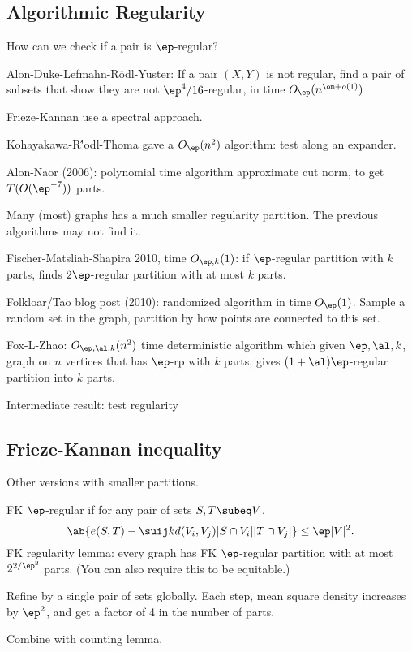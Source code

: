\subsection{Algorithmic Regularity}

How can we check if a pair is $\ep$-regular?

Alon-Duke-Lefmahn-R\"odl-Yuster: If a pair $(X,Y)$ is not regular, find a pair of subsets that show they are not $\ep^4/16$-regular, in time $O_\ep(n^{\om+o(1)})$

Frieze-Kannan use a spectral approach.

Kohayakawa-R\''odl-Thoma gave a $O_\ep(n^2)$ algorithm: test along an expander.

Alon-Naor (2006): polynomial time algorithm approximate cut norm, to get $T(O(\ep^{-7}))$ parts.

Many (most) graphs has a much smaller regularity partition. The previous algorithms may not find it. 

Fischer-Matsliah-Shapira 2010, time $O_{\ep,k}(1)$: if $\ep$-regular partition with $k$ parts, finds $2\ep$-regular partition with at most $k$ parts.

Folkloar/Tao blog post (2010): randomized algorithm in time $O_\ep(1)$. Sample a random set in the graph, partition by how points are connected to this set.

Fox-L-Zhao: $O_{\ep,\al, k}(n^2)$ time deterministic algorithm which given $\ep,\al,k$, graph on $n$ vertices that has $\ep$-rp with $k$ parts, gives $(1+\al)\ep$-regular partition into $k$ parts. 

Intermediate result: test regularity

\subsection{Frieze-Kannan inequality}

Other versions with smaller partitions.

FK $\ep$-regular if for any pair of sets $S,T\subeq V$,
$$
\ab{
e(S,T)-\suij kd(V_i,V_j) |S\cap V_i||T\cap V_j|
} \le \ep|V|^2.
$$
FK regularity lemma: every graph has FK $\ep$-regular partition with at most $2^{2/\ep^2}$ parts.  (You can also require this to be equitable.)

Refine by a single pair of sets globally. Each step, mean square density increases by $\ep^2$, and get a factor of 4 in the number of parts.

Combine with counting lemma.


